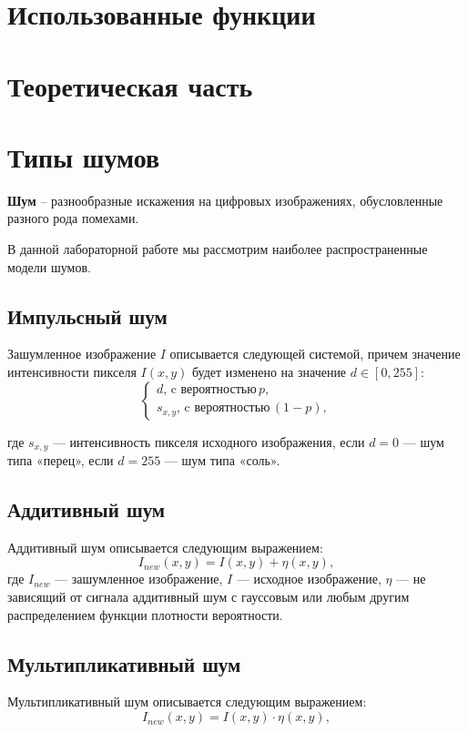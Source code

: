\section{Использованные функции}



\section{Теоретическая часть}



\section{Типы шумов}

\textbf{Шум} -- разнообразные
искажения на цифровых изображениях, обусловленные разного рода помехами.

В данной лабораторной работе мы рассмотрим наиболее распространенные модели шумов.
\subsection{Импульсный шум}
Зашумленное изображение $I$ описывается следующей системой, причем значение интенсивности пикселя $I(x,y)$ будет изменено на значение $d \in [0,255]$:
\begin{equation}
    \begin{cases} d,\, \text{c вероятностью}\, p, \\
    s_{x,y},\, \text{c вероятностью}\, (1-p),
    \end{cases}
\end{equation}

где $s_{x,y}$ — интенсивность пикселя исходного изображения, если $d = 0$ — шум типа «перец», если
$d = 255$ — шум типа «соль».

\subsection{Аддитивный шум}
Аддитивный шум описывается следующим выражением:
\begin{equation}
    I_{new}(x,y) = I(x,y)  + \eta(x,y),
\end{equation}
где $ I_{new}$ — зашумленное изображение, $I$ — исходное изображение, $\eta$ — не зависящий от сигнала аддитивный шум с гауссовым или любым другим распределением функции плотности вероятности.


\subsection{Мультипликативный шум}
Мультипликативный шум описывается следующим выражением:
\begin{equation}
    I_{new}(x,y) = I(x,y) \cdot \eta(x,y),
\end{equation}

